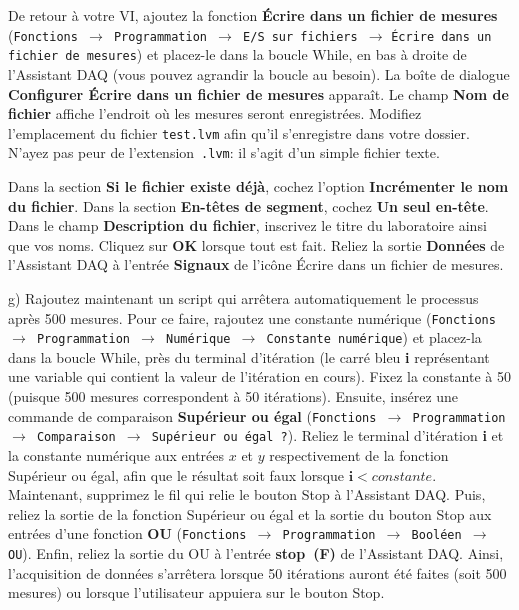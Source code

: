 \documentclass[canadien,12pt,oneside,letterpaper]{article}
\begin{document}
De retour à votre VI, ajoutez la fonction \textbf{Écrire dans un fichier de mesures} (\texttt{Fonctions $\rightarrow$ Programmation $\rightarrow$ E/S sur fichiers $\rightarrow$} \texttt{Écrire dans un fichier de mesures}) et placez-le dans la boucle While, en bas à droite de l'Assistant DAQ (vous pouvez agrandir la boucle au besoin). La boîte de dialogue \textbf{Configurer Écrire dans un fichier de mesures} apparaît. Le champ \textbf{Nom de fichier} affiche l'endroit où les mesures seront enregistrées. Modifiez l'emplacement du fichier \texttt{test.lvm} afin qu'il s'enregistre dans votre dossier. N'ayez pas peur de l'extension~\texttt{.lvm}: il s'agit d'un simple fichier texte. 

Dans la section \textbf{Si le fichier existe déjà}, cochez l'option \textbf{Incrémenter le nom du fichier}. Dans la section \textbf{En-têtes de segment}, cochez \textbf{Un seul en-tête}. Dans le champ \textbf{Description du fichier}, inscrivez le titre du laboratoire ainsi que vos noms. Cliquez sur \textbf{OK} lorsque tout est fait. Reliez la sortie \textbf{Données} de l'Assistant DAQ à l'entrée \textbf{Signaux} de l'icône Écrire dans un fichier de mesures.

g) Rajoutez maintenant un script qui arrêtera automatiquement le processus après 500 mesures. Pour ce faire, rajoutez une constante numérique (\texttt{Fonctions $\rightarrow$ Programmation $\rightarrow$ Numérique $\rightarrow$ Constante numérique}) et placez-la dans la boucle While, près du terminal d'itération (le carré bleu \textbf{i} représentant une variable qui contient la valeur de l'itération en cours). Fixez la constante à 50 (puisque 500 mesures correspondent à 50 itérations). Ensuite, insérez une commande de comparaison \textbf{Supérieur ou égal} (\texttt{Fonctions $\rightarrow$ Programmation $\rightarrow$ Comparaison $\rightarrow$ Supérieur ou égal~?}). Reliez le terminal d'itération \textbf{i} et la constante numérique aux entrées $x$ et $y$ respectivement de la fonction Supérieur ou égal, afin que le résultat soit faux lorsque $\mathbf{i}<constante$. Maintenant, supprimez le fil qui relie le bouton Stop à l'Assistant DAQ. Puis, reliez la sortie de la fonction Supérieur ou égal et la sortie du bouton Stop aux entrées d'une fonction \textbf{OU} (\texttt{Fonctions $\rightarrow$ Programmation $\rightarrow$ Booléen $\rightarrow$ OU}). Enfin, reliez la sortie du OU à l'entrée \textbf{stop~(F)} de l'Assistant DAQ. Ainsi, l'acquisition de données s'arrêtera lorsque 50 itérations auront été faites (soit 500 mesures) ou lorsque l'utilisateur appuiera sur le bouton Stop.
\end{document}
